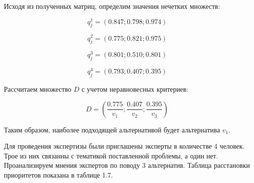 
Исходя из полученных матриц, определим значения нечетких множеств:

\begin{equation}
    q^1_j=(0.847;0.798;0.974) 
\end{equation}

\begin{equation}
    q^2_j=(0.775;0.821;0.975)
\end{equation}

\begin{equation}
    q^3_j=(0.801;0.510;0.801)
\end{equation}

\begin{equation}
    q^4_j=(0.793;0.407;0.395)
\end{equation}

Рассчитаем множество $D$ с учетом неравновесных критериев:

\begin{equation}
    D=(\frac{0.775}{v_1};\frac{0.407}{v_2};\frac{0.395}{v_3})
\end{equation}

Таким образом, наиболее подходящей альтернативой будет альтернатива $v_1$.

Для проведения экспертизы были приглашены эксперты в количестве 4 человек. Трое из них связанны с тематикой поставленной проблемы, а один нет.
Проанализируем мнения экспертов по поводу 3 альтернатив. Таблица расстановки приоритетов показана в таблице 1.7. 

